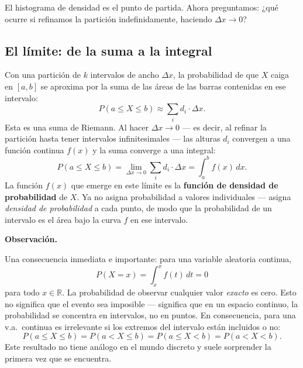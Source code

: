 \documentclass[12pt, a4paper]{book}
\newenvironment{observacion}{%
    \par\medskip\noindent\textbf{\color{azul}Observaci\'{o}n.}\enspace\itshape
}{\par\medskip}
\numberwithin{equation}{chapter}
\begin{document}
El histograma de densidad es el punto de partida. Ahora preguntamos:
¿qué ocurre si refinamos la partición indefinidamente, haciendo
$\Delta x \to 0$?

\subsection{El límite: de la suma a la integral}

Con una partición de $k$ intervalos de ancho $\Delta x$, la
probabilidad de que $X$ caiga en $[a, b]$ se aproxima por la suma
de las áreas de las barras contenidas en ese intervalo:
\[
P(a \leq X \leq b) \approx \sum_{i} d_i \cdot \Delta x.
\]
Esta es una suma de Riemann. Al hacer $\Delta x \to 0$ --- es decir,
al refinar la partición hasta tener intervalos infinitesimales ---
las alturas $d_i$ convergen a una función continua $f(x)$ y la suma
converge a una integral:
\[
P(a \leq X \leq b) = \lim_{\Delta x \to 0}
\sum_{i} d_i \cdot \Delta x = \int_a^b f(x)\, dx.
\]
La función $f(x)$ que emerge en este límite es la
\textbf{función de densidad de probabilidad} de $X$. Ya no
asigna probabilidad a valores individuales --- asigna
\emph{densidad de probabilidad} a cada punto, de modo que la
probabilidad de un intervalo es el área bajo la curva $f$ en ese
intervalo.

\begin{observacion}
	Una consecuencia inmediata e importante: para una variable
	aleatoria continua,
	\[
	P(X = x) = \int_x^x f(t)\, dt = 0
	\]
	para todo $x \in \mathbb{R}$. La probabilidad de observar
	cualquier valor \emph{exacto} es cero. Esto no significa que
	el evento sea imposible --- significa que en un espacio continuo,
	la probabilidad se concentra en intervalos, no en puntos. En
	consecuencia, para una v.a.\ continua es irrelevante si los
	extremos del intervalo están incluidos o no:
	\[
	P(a \leq X \leq b) = P(a < X \leq b) =
	P(a \leq X < b) = P(a < X < b).
	\]
	Este resultado no tiene análogo en el mundo discreto y suele
	sorprender la primera vez que se encuentra.
\end{observacion}
\end{document}
